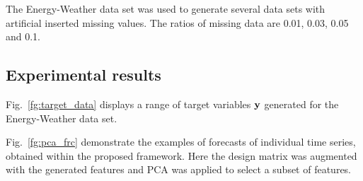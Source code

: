 \documentclass[conference]{IEEEtran}
\begin{document}
The Energy-Weather data set was used to generate several data sets with artificial inserted missing values. The ratios of missing data are 0.01, 0.03, 0.05 and 0.1.



\subsection{Experimental results}

Fig.~\ref{fg:target_data} displays a range of target variables ${\mathbf{y}}$ generated for the Energy-Weather data set.

Fig.~\ref{fg:pca_frc} demonstrate the examples of forecasts of individual time series, obtained within the proposed framework. Here the design matrix was augmented with the generated features and PCA was applied to select a subset of features.
\end{document}

